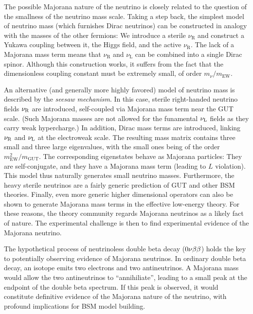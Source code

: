 \documentclass[../thesis.tex]{subfiles}
\begin{document}
The possible Majorana nature of the neutrino is closely related to the question
of the smallness of the neutrino mass scale. Taking a step back, the simplest
model of neutrino mass (which furnishes Dirac neutrinos) can be constructed in
analogy with the masses of the other fermions: We introduce a sterile
$\nu_{\text{R}}$ and construct a Yukawa coupling between it, the Higgs field, and
the active $\nu_{\text{R}}$. The lack of a Majorana mass term means that
$\nu_{\text{R}}$ and $\nu_{\text{L}}$ can be combined into a single Dirac spinor.
Although this construction works, it suffers from the fact that the
dimensionless coupling constant must be extremely small, of order
$m_\nu/m_{\text{EW}}$.

An alternative (and generally more highly favored) model of neutrino mass is
described by the \emph{seesaw mechanism}. In this case, sterile right-handed
neutrino fields $\nu_{\text{R}}$ are introduced, self-coupled via Majorana mass term near
the GUT scale. (Such Majorana masses are not allowed for the funamental $\nu_{\text{L}}$
fields as they carry weak hypercharge.) In addition, Dirac mass terms are
introduced, linking $\nu_{\text{R}}$ and $\nu_{\text{L}}$ at the electroweak scale. The resulting
mass matrix contains three small and three large eigenvalues, with the small
ones being of the order \(m^2_{\text{EW}} / m_{\text{GUT}}\). The corresponding
eigenstates behave as Majorana particles: They are self-conjugate, and they have
a Majorana mass term (leading to $L$ violation). This model thus naturally
generates small neutrino masses. Furthermore, the heavy sterile neutrinos are a
fairly generic prediction of GUT and other BSM theories. Finally, even more
generic higher dimensional operators can also be shown to generate Majorana mass
terms in the effective low-energy theory. For these reasons, the theory
community regards Majorana neutrinos as a likely fact of nature. The
experimental challenge is then to find experimental evidence of the Majorana
neutrino.

The hypothetical process of neutrinoless double beta decay ($0\nu\beta\beta$) holds the
key to potentially observing evidence of Majorana neutrinos. In ordinary double
beta decay, an isotope emits two electrons and two antineutrinos. A Majorana
mass would allow the two antineutrinos to ``annihiliate'', leading to a small
peak at the endpoint of the double beta spectrum. If this peak is observed, it
would constitute definitive evidence of the Majorana nature of the neutrino,
with profound implications for BSM model building.
\end{document}

